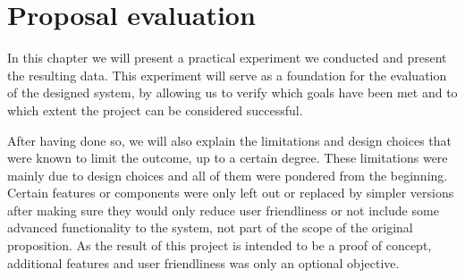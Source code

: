 \chapter{Proposal evaluation} \label{chap:eval}
In this chapter we will present a practical experiment we conducted and present the resulting data.
This experiment will serve as a foundation for the evaluation of the designed system, by allowing us to verify which goals have been met and to which extent the project can be considered successful.

After having done so, we will also explain the limitations and design choices that were known to limit the outcome, up to a certain degree.
These limitations were mainly due to design choices and all of them were pondered from the beginning.
Certain features or components were only left out or replaced by simpler versions after making sure they would only reduce user friendliness or not include some advanced functionality to the system, not part of the scope of the original proposition.
As the result of this project is intended to be a proof of concept, additional features and user friendliness was only an optional objective.






